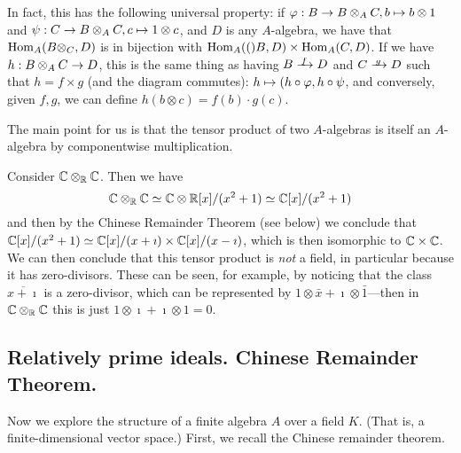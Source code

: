 In fact, this has the following universal property: if $\varphi: B \to B \otimes_{A} C, b \mapsto b \otimes 1$ and $\psi: C \to B \otimes_{A} C, c \mapsto 1 \otimes c$, and $D$ is any $A$-algebra, we have that $\mathrm{Hom}_{A}({B \otimes_{C}, D})$ is in bijection with $\mathrm{Hom}_{A}({(})B, D) \times \mathrm{Hom}_{A}({C, D})$.
If we have $h: B \otimes_{A} C \to D$, this is the same thing as having $B \namedmap{f} D$ and $C \namedmap{g} D$ such that $h = f \times g$ (and the diagram commutes): $h \mapsto (h \circ \varphi, h \circ \psi$, and conversely, given $f, g$, we can define $h(b \otimes c) = f(b) \cdot g(c)$.

The main point for us is that the tensor product of two $A$-algebras is itself an $A$-algebra by componentwise multiplication.

\begin{ex}
Consider $\mathbb{C} \otimes_{\mathbb{R}} \mathbb{C}$. Then we have \[ \mathbb{C} \otimes_{\mathbb{R}} \mathbb{C} \simeq \mathbb{C} \otimes \mathbb{R}[x]/(x^2 + 1) \simeq \mathbb{C}[x] / (x^2 + 1) \]
and then by the Chinese Remainder Theorem (see below) we conclude that $\mathbb{C}[x] / (x^2 + 1) \simeq \mathbb{C}[x] / (x + \imath) \times \mathbb{C}[x] / (x - \imath)$, which is then isomorphic to $\mathbb{C} \times \mathbb{C}$.
We can then conclude that this tensor product is \emph{not} a field, in particular because it has zero-divisors.
These can be seen, for example, by noticing that the class $\overline{x + \imath}$ is a zero-divisor, which can be represented by $1 \otimes \bar{x} + \imath \otimes \bar{1}$---then in $\mathbb{C} \otimes_{\mathbb{R}} \mathbb{C}$ this is just $1 \otimes \imath + \imath \otimes 1 = 0$.
\end{ex}

\subsection{Relatively prime ideals. Chinese Remainder Theorem.}
Now we explore the structure of a finite algebra $A$ over a field $K$. 
(That is, a finite-dimensional vector space.)
First, we recall the Chinese remainder theorem.

